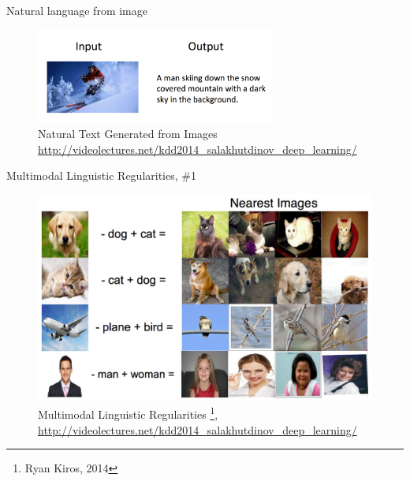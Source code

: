 \documentclass[10pt]{beamer}
\begin{document}
\begin{frame}{Natural language from image}

\begin{figure}[h!]
	\centering
	\includegraphics[width=0.7\textwidth]{images/nl_generation.png}
	\caption{Natural Text Generated from	 Images \\ \url{http://videolectures.net/kdd2014_salakhutdinov_deep_learning/}}
\end{figure} 

\end{frame}


\begin{frame}{Multimodal Linguistic Regularities, \#1}

\begin{figure}[h!]
	\centering
	\includegraphics[width=1\textwidth]{images/mlr1.png}
	\caption{Multimodal Linguistic Regularities \footnote{Ryan Kiros, 2014},\\ \url{http://videolectures.net/kdd2014_salakhutdinov_deep_learning/}}
\end{figure} 

\end{frame}
\end{document}
